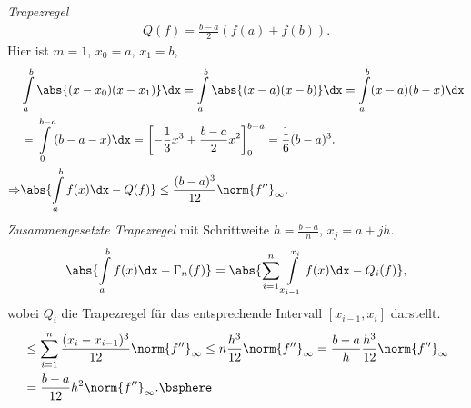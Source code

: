 \begin{bspn}
\textit{Trapezregel}
\begin{align*}
Q(f) = \frac{b-a}{2}\left(f(a) + f(b) \right).
\end{align*}
Hier ist $m=1$, $x_0=a$, $x_1=b$,
\begin{align*}
&\int\limits_a^b \abs{(x-x_0)(x-x_1)}\dx = \int\limits_a^b \abs{(x-a)(x-b)}\dx
= \int\limits_a^b (x-a)(b-x)\dx \\ 
&= \int\limits_0^{b-a} (b-a-x)\dx = 
\left[-\frac{1}{3}x^3 + \frac{b-a}{2}x^2 \right]_0^{b-a} = \frac{1}{6}(b-a)^3.\\
\Rightarrow & \abs{\int\limits_a^b f(x)\dx - Q(f)} \le
\frac{(b-a)^3}{12}\norm{f''}_\infty.
\end{align*}
\textit{Zusammengesetzte Trapezregel} mit Schrittweite $h=\frac{b-a}{n}$,
$x_j=a+j h$.
\begin{align*}
\abs{\int\limits_a^b f(x)\dx-\Gamma_n(f)} = \abs{\sum\limits_{i=1}^n
\int\limits_{x_{i-1}}^{x_i}f(x)\dx - Q_i(f)},
\end{align*}
wobei $Q_i$ die Trapezregel für das entsprechende Intervall $[x_{i-1},x_i]$
darstellt.
\begin{align*}
&\le \sum\limits_{i=1}^n \frac{(x_i-x_{i-1})^3}{12}\norm{f''}_\infty \le
n\frac{h^3}{12}\norm{f''}_\infty = \frac{b-a}{h}\frac{h^3}{12}\norm{f''}_\infty
\\ &= \frac{b-a}{12}h^2\norm{f''}_\infty.\bsphere
\end{align*}
\end{bspn}
